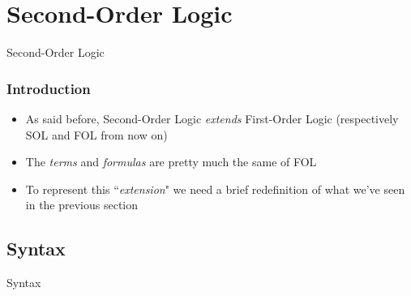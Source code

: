 \documentclass{beamer}
\begin{document}
        \section{Second-Order Logic}
            \begin{frame}
                \begin{center}
                    \vspace*{1cm}
                    \begin{Huge}
                        \textcolor{title_blue}{Second-Order Logic}
                    \end{Huge}
                \end{center}
            \end{frame}

            \begin{frame}
                \frametitle{Introduction}
                \begin{itemize}
                    \item As said before, Second-Order Logic \textit{extends} First-Order Logic (respectively SOL and FOL from now on)
                    \item The \textit{terms} and \textit{formulas} are pretty much the same of FOL
                    \item To represent this ``\textit{extension}" we need a brief redefinition of what we've seen in the previous section
                \end{itemize}
            \end{frame}

            \subsection{Syntax}
                \begin{frame}
                    \vspace*{1cm}
                    \begin{center}
                        \begin{Huge}
                            \textcolor{title_blue}{Syntax}
                        \end{Huge}
                    \end{center}
                \end{frame}
\end{document}
